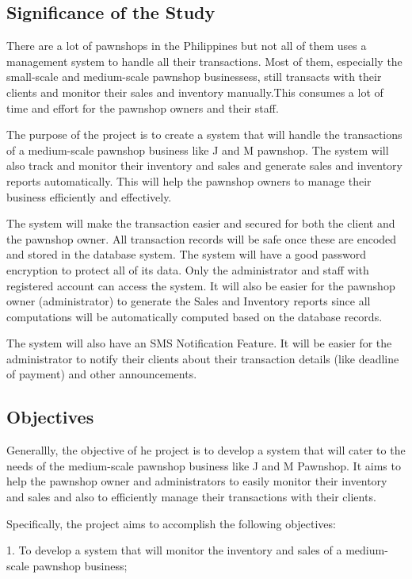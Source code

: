 \documentclass[journal]{./IEEE/IEEEtran}
\begin{document}
\subsection{Significance of the Study}
There are a lot of pawnshops in the Philippines but not all of them uses a management system to handle all their transactions. Most of them, especially the small-scale and medium-scale pawnshop businessess, still transacts with their clients and monitor their sales and inventory manually.This consumes a lot of time and effort for the pawnshop owners and their staff.

The purpose of the project is to create a system that will handle the transactions of a medium-scale pawnshop business like J and M pawnshop. The system will also track and monitor their inventory and sales and generate sales and inventory reports automatically. This will help the pawnshop owners to manage their business efficiently and effectively.

The system will make the transaction easier and secured for both the client and the pawnshop owner. All transaction records will be safe once these are encoded and stored in the database system. The system will have a good password encryption to protect all of its data. Only the administrator and staff with registered account can access the system. It will also be easier for the pawnshop owner (administrator) to generate the Sales and Inventory reports since all computations will be automatically computed based on the database  records. 

The system will also have an SMS Notification Feature. It will be easier for the administrator to notify their clients about their transaction details (like deadline of payment) and other announcements. 

\subsection{Objectives}
Generallly, the objective of he project is to develop a system that will cater to the needs of the medium-scale pawnshop business like J and M Pawnshop. It aims to help the pawnshop owner and administrators to easily monitor their inventory and sales and also to efficiently manage their transactions with their clients.

Specifically, the project aims to accomplish the following objectives:

1. To develop a system that will monitor the inventory and sales of a medium-scale pawnshop business;
\end{document}
